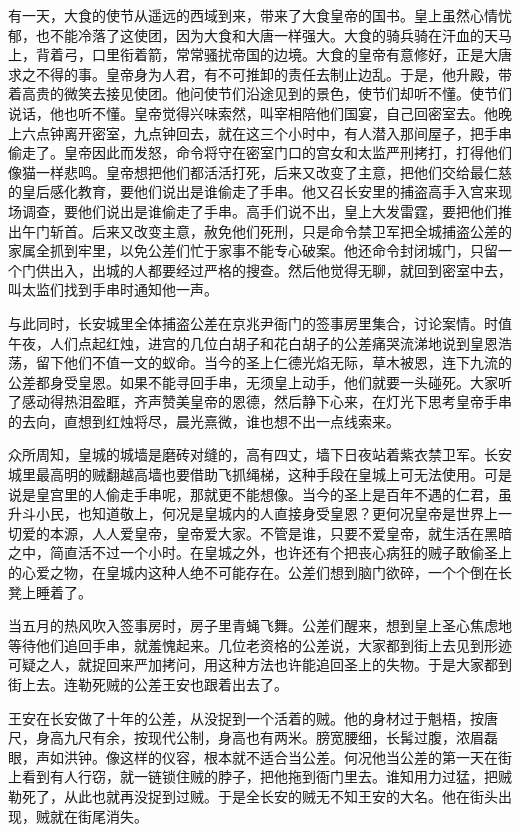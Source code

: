 有一天，大食的使节从遥远的西域到来，带来了大食皇帝的国书。皇上虽然心情忧郁，也不能冷落了这使团，因为大食和大唐一样强大。大食的骑兵骑在汗血的天马上，背着弓，口里衔着箭，常常骚扰帝国的边境。大食的皇帝有意修好，正是大唐求之不得的事。皇帝身为人君，有不可推卸的责任去制止边乱。于是，他升殿，带着高贵的微笑去接见使团。他问使节们沿途见到的景色，使节们却听不懂。使节们说话，他也听不懂。皇帝觉得兴味索然，叫宰相陪他们国宴，自己回密室去。他晚上六点钟离开密室，九点钟回去，就在这三个小时中，有人潜入那间屋子，把手串偷走了。皇帝因此而发怒，命令将守在密室门口的宫女和太监严刑拷打，打得他们像猫一样悲鸣。皇帝想把他们都活活打死，后来又改变了主意，把他们交给最仁慈的皇后感化教育，要他们说出是谁偷走了手串。他又召长安里的捕盗高手入宫来现场调查，要他们说出是谁偷走了手串。高手们说不出，皇上大发雷霆，要把他们推出午门斩首。后来又改变主意，赦免他们死刑，只是命令禁卫军把全城捕盗公差的家属全抓到牢里，以免公差们忙于家事不能专心破案。他还命令封闭城门，只留一个门供出入，出城的人都要经过严格的搜查。然后他觉得无聊，就回到密室中去，叫太监们找到手串时通知他一声。 

与此同时，长安城里全体捕盗公差在京兆尹衙门的签事房里集合，讨论案情。时值午夜，人们点起红烛，进宫的几位白胡子和花白胡子的公差痛哭流涕地说到皇恩浩荡，留下他们不值一文的蚁命。当今的圣上仁德光焰无际，草木被恩，连下九流的公差都身受皇恩。如果不能寻回手串，无须皇上动手，他们就要一头碰死。大家听了感动得热泪盈眶，齐声赞美皇帝的恩德，然后静下心来，在灯光下思考皇帝手串的去向，直想到红烛将尽，晨光熹微，谁也想不出一点线索来。 

众所周知，皇城的城墙是磨砖对缝的，高有四丈，墙下日夜站着紫衣禁卫军。长安城里最高明的贼翻越高墙也要借助飞抓绳梯，这种手段在皇城上可无法使用。可是说是皇宫里的人偷走手串呢，那就更不能想像。当今的圣上是百年不遇的仁君，虽升斗小民，也知道敬上，何况是皇城内的人直接身受皇恩？更何况皇帝是世界上一切爱的本源，人人爱皇帝，皇帝爱大家。不管是谁，只要不爱皇帝，就生活在黑暗之中，简直活不过一个小时。在皇城之外，也许还有个把丧心病狂的贼子敢偷圣上的心爱之物，在皇城内这种人绝不可能存在。公差们想到脑门欲碎，一个个倒在长凳上睡着了。 

当五月的热风吹入签事房时，房子里青蝇飞舞。公差们醒来，想到皇上圣心焦虑地等待他们追回手串，就羞愧起来。几位老资格的公差说，大家都到街上去见到形迹可疑之人，就捉回来严加拷问，用这种方法也许能追回圣上的失物。于是大家都到街上去。连勒死贼的公差王安也跟着出去了。 

王安在长安做了十年的公差，从没捉到一个活着的贼。他的身材过于魁梧，按唐尺，身高九尺有余，按现代公制，身高也有两米。膀宽腰细，长髯过腹，浓眉磊眼，声如洪钟。像这样的仪容，根本就不适合当公差。何况他当公差的第一天在街上看到有人行窃，就一链锁住贼的脖子，把他拖到衙门里去。谁知用力过猛，把贼勒死了，从此也就再没捉到过贼。于是全长安的贼无不知王安的大名。他在街头出现，贼就在街尾消失。 

